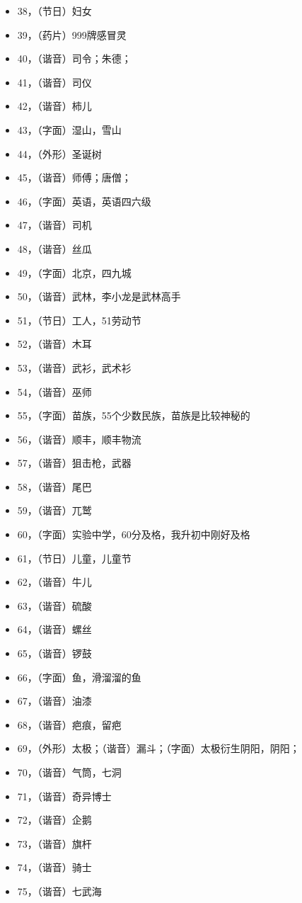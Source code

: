 \begin{itemize}
\item 38，（节日）妇女
\item 39，（药片）999牌感冒灵
\item 40，（谐音）司令；朱德；
\item 41，（谐音）司仪
\item 42，（谐音）柿儿
\item 43，（字面）湿山，雪山
\item 44，（外形）圣诞树
\item 45，（谐音）师傅；唐僧；
\item 46，（字面）英语，英语四六级
\item 47，（谐音）司机
\item 48，（谐音）丝瓜
\item 49，（字面）北京，四九城
\item 50，（谐音）武林，李小龙是武林高手
\item 51，（节日）工人，51劳动节
\item 52，（谐音）木耳
\item 53，（谐音）武衫，武术衫
\item 54，（谐音）巫师
\item 55，（字面）苗族，55个少数民族，苗族是比较神秘的
\item 56，（谐音）顺丰，顺丰物流
\item 57，（谐音）狙击枪，武器
\item 58，（谐音）尾巴
\item 59，（谐音）兀鹫
\item 60，（字面）实验中学，60分及格，我升初中刚好及格
\item 61，（节日）儿童，儿童节
\item 62，（谐音）牛儿
\item 63，（谐音）硫酸
\item 64，（谐音）螺丝
\item 65，（谐音）锣鼓
\item 66，（字面）鱼，滑溜溜的鱼
\item 67，（谐音）油漆
\item 68，（谐音）疤痕，留疤
\item 69，（外形）太极；（谐音）漏斗；（字面）太极衍生阴阳，阴阳；
\item 70，（谐音）气筒，七洞
\item 71，（谐音）奇异博士
\item 72，（谐音）企鹅
\item 73，（谐音）旗杆
\item 74，（谐音）骑士
\item 75，（谐音）七武海

\end{itemize}

